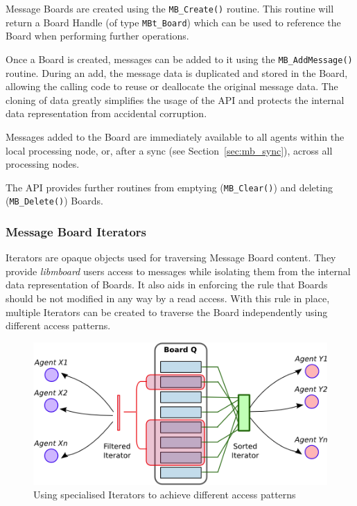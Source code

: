 Message Boards are created using the \texttt{MB\_Create()} routine. This routine will return a Board Handle (of type \texttt{MBt\_Board}) which can be used to reference the Board when performing further operations.

Once a Board is created, messages can be added to it using the \texttt{MB\_AddMessage()} routine. During an add, the message data is duplicated and stored in the Board, allowing the calling code to reuse or deallocate the original message data. The cloning of data greatly simplifies the usage of the API and protects the internal data representation from accidental corruption. 

Messages added to the Board are immediately available to all agents within the local processing node, or, after a sync (see Section~\ref{sec:mb_sync}), across all processing nodes.

The API provides further routines from emptying (\texttt{MB\_Clear()}) and deleting  (\texttt{MB\_Delete()}) Boards.

\subsubsection{Message Board Iterators}
\label{sec:mb_iterators}

Iterators are opaque objects used for traversing Message Board content. They provide \textit{libmboard} users access to messages while isolating them from the internal data representation of Boards. It also aids in enforcing the rule that Boards should be not modified in any way by a read access. With this rule in place, multiple Iterators can be created to traverse the Board independently using different access patterns.

\begin{figure}[ht]
 \centering
  \includegraphics[scale=0.8]{iterator.png}
 \caption{Using specialised Iterators to achieve different access patterns}
 \label{fig:mb_iterators}
\end{figure}


